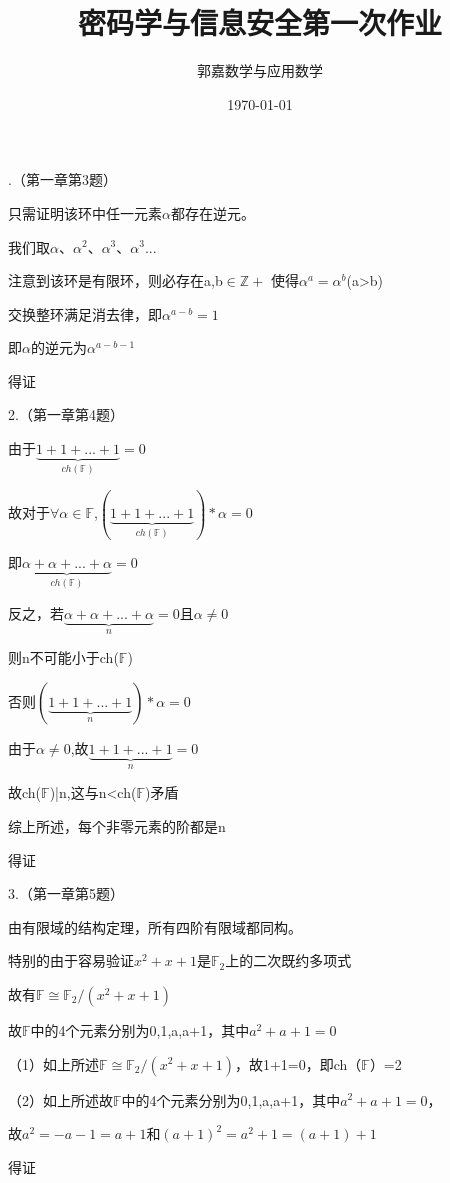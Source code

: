 \documentclass{ctexart}
\title{密码学与信息安全第一次作业}
\author{郭嘉\quad17345019\quad 数学与应用数学}
\date{\today}
\begin{document}
	.（第一章第3题）
	
	只需证明该环中任一元素$\alpha$都存在逆元。
	
	我们取$\alpha$、$\alpha^2$、$\alpha^3$、$\alpha^3$...
	
	注意到该环是有限环，则必存在a,b$\in \mathbb{Z+}$ 使得$\alpha^a=\alpha^b$(a>b)
	
	交换整环满足消去律，即$\alpha^{a-b}=1$
	
	即$\alpha$的逆元为$\alpha^{a-b-1}$
	
	得证
	
	2.（第一章第4题）
	
	
	由于$\underbrace{1+1+...+1}_{ch(\mathbb{F})}=0$ 
	
	故对于$ {\forall}\alpha\in\mathbb{F}$,$(\underbrace{1+1+...+1}_{ch(\mathbb{F})})*\alpha=0$ 
	
	即$\underbrace{\alpha+\alpha+...+\alpha}_{ch(\mathbb{F})}=0$ 
	
	反之，若$\underbrace{\alpha+\alpha+...+\alpha}_{n}=0$且$\alpha\neq0$
	
	则n不可能小于ch($\mathbb{F}$)
	
	否则$(\underbrace{1+1+...+1}_{n})*\alpha=0$
	
	由于$\alpha\neq0$,故$\underbrace{1+1+...+1}_{n}=0$
	
	故ch($\mathbb{F}$)|n,这与n<ch($\mathbb{F}$)矛盾
	
	综上所述，每个非零元素的阶都是n
	
	得证
	
	
	
	3.（第一章第5题）
	
	由有限域的结构定理，所有四阶有限域都同构。
	
	特别的由于容易验证$x^2+x+1$是$\mathbb{F}$$_{2}$上的二次既约多项式
	
	故有$\mathbb{F}$$\cong$$\mathbb{F}$$_{2}$$/(x^2+x+1)$
	
	故$\mathbb{F}$中的4个元素分别为0,1,a,a+1，其中$a^2+a+1=0$
	
    （1）如上所述$\mathbb{F}$$\cong$$\mathbb{F}$$_{2}$$/(x^2+x+1)$，故1+1=0，即ch（$\mathbb{F}$）=2
    
    （2）如上所述故$\mathbb{F}$中的4个元素分别为0,1,a,a+1，其中$a^2+a+1=0$，
    
    故$a^2=-a-1=a+1$和$(a+1)^2=a^2+1=(a+1)+1$
    
    得证
    
\end{document}
